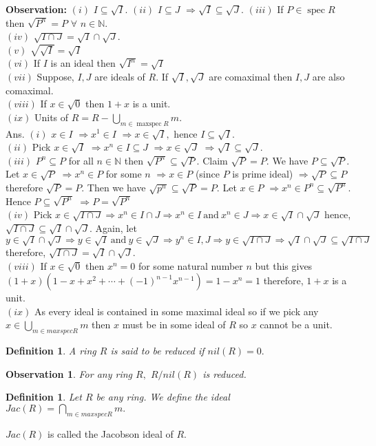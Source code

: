 \documentclass[11pt]{amsart}
\newtheorem{definition}[theorem]{Definition}%
\newtheorem{obs}[theorem]{Observation}
\newcommand{\NN}{\mathbb N}
\DeclareMathOperator{\spec}{\text{spec}}
\DeclareMathOperator{\mspec}{\text{maxspec}}
\begin{document}
\textbf{Observation:} $(i)$ $I \subseteq \sqrt{I}.$ 
\newline $(ii)$ $I \subseteq J$ $\Rightarrow \sqrt{I} \subseteq \sqrt{J}.$ 
\newline $(iii)$ If $P \in \spec R$ then $\sqrt{P^n}=P$ $\forall$ $n \in {\NN}.$\\
$(iv)$ $\sqrt{I\cap J}=\sqrt{I}\cap \sqrt{J}.$\\
$(v)$ $\sqrt{\sqrt{I}}=\sqrt{I}$\\
$(vi)$ If $I$ is  an ideal then $\sqrt{I^n}=\sqrt{I}$\\
$(vii)$ Suppose, $I,J$ are ideals of $R.$ If $\sqrt{I},\sqrt{J}$ are comaximal then $I,J$ are also comaximal.\\
$(viii)$ If $x\in \sqrt{0}$ then $1+x$ is a unit.\\
$(ix)$ Units of $R=R-\displaystyle\bigcup_{m\in \mspec R} m.$\\
Ans. $(i)$ $x \in I$ $\Rightarrow x^1\in I$ $\Rightarrow x \in \sqrt{I},$ hence $I \subseteq \sqrt{I}.$\\
$(ii)$ Pick $x \in \sqrt{I}$ $\Rightarrow x^n\in I\subseteq J$ $\Rightarrow x \in \sqrt{J}$ $\Rightarrow \sqrt{I} \subseteq \sqrt{J}.$\\
$(iii)$ $P^n \subseteq P$ for all $n \in {\NN}$ then $\sqrt{P^n} \subseteq \sqrt{P}.$ Claim $\sqrt{P}=P.$ We have $P\subseteq \sqrt{P}.$ Let $x \in \sqrt{P}$ $\Rightarrow x^n \in P$ for some $n$ $\Rightarrow x \in P$ (since $P$ is prime ideal) $\Rightarrow \sqrt{P} \subseteq P$ therefore $\sqrt{P}=P.$ Then we have $\sqrt{p^n}\subseteq \sqrt{P}=P.$ Let $x\in P$ $\Rightarrow x^n \in P^n \subseteq \sqrt{P^n}.$ Hence $P\subseteq \sqrt{P^n}$ $\Rightarrow P=\sqrt{P^n}$ \\
$(iv)$ Pick $x\in \sqrt{I\cap J} \Rightarrow x^n\in I\cap J \Rightarrow x^n\in I ~\text{and}~ x^n\in J \Rightarrow x\in \sqrt{I}\cap \sqrt{J}$ hence, $\sqrt{I\cap J}\subseteq \sqrt{I}\cap \sqrt{J}.$ Again, let $y\in \sqrt{I}\cap \sqrt{J} \Rightarrow y\in \sqrt{I} ~\text{and}~ y\in \sqrt{J} \Rightarrow y^n\in I, J \Rightarrow y\in \sqrt{I\cap J} \Rightarrow \sqrt{I}\cap \sqrt{J} \subseteq \sqrt{I\cap J}$ therefore, $\sqrt{I\cap J}=\sqrt{I}\cap \sqrt{J}.$\\
$(viii)$ If $x\in \sqrt{0}$ then $x^n=0$ for some natural number $n$ but this gives $(1+x)(1-x+x^2+\cdots +(-1)^{n-1}x^{n-1})=1-x^n=1$ therefore, $1+x$ is a unit.\\
$(ix)$ As every ideal is contained in some maximal ideal so if we pick any $x\in  \displaystyle\bigcup_{m\in maxspec R} m$ then $x$ must be in some ideal of $R$ so $x$ cannot be a unit.
\begin{definition}
A ring $R$ is said to be reduced if $nil(R)=0.$ 
\end{definition}
\begin{obs}
For any ring $R,$ $R/nil(R)$ is reduced.
\end{obs}
\begin{definition}
Let $R$ be any ring. We define the ideal $Jac(R)={\displaystyle\bigcap_{m \in maxspecR}m}.$
\end{definition}
$Jac(R)$ is called the Jacobson ideal of $R.$
\end{document}
